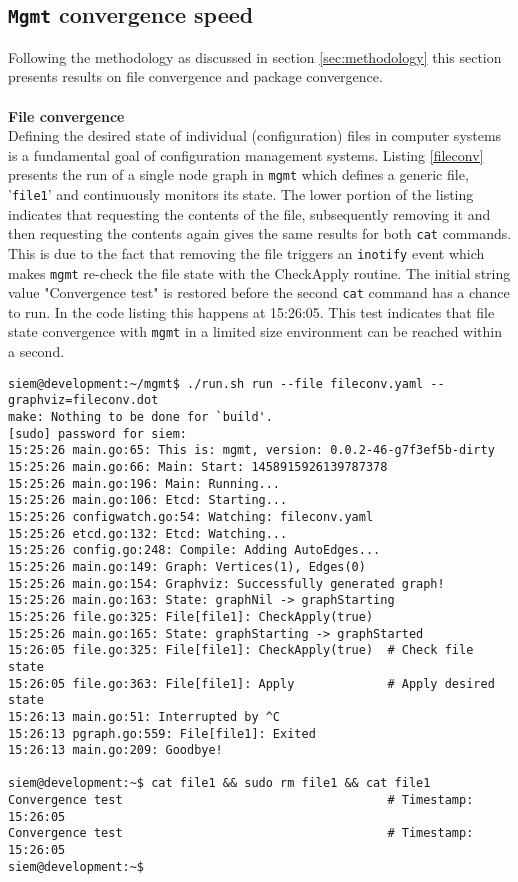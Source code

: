 \subsection{\texttt{Mgmt} convergence speed}
Following the methodology as discussed in section \ref{sec:methodology} this section presents results on file convergence and package convergence. 
\\\\
\noindent
\textbf{File convergence}\\
Defining the desired state of individual (configuration) files in computer systems is a fundamental goal of configuration management systems. Listing \ref{fileconv} presents the run of a single node graph in \texttt{mgmt} which defines a generic file, '\texttt{file1}' and continuously monitors its state. The lower portion of the listing indicates that requesting the contents of the file, subsequently removing it and then requesting the contents again gives the same results for both \texttt{cat} commands. This is due to the fact that removing the file triggers an \texttt{inotify} event which makes \texttt{mgmt} re-check the file state with the CheckApply routine. The initial string value "Convergence test" is restored before the second \texttt{cat} command has a chance to run. In the code listing this happens at 15:26:05. This test indicates that file state convergence with \texttt{mgmt} in a limited size environment can be reached within a second.
\\
\begin{lstlisting}[caption={Rapid file convergence in \texttt{mgmt}},label=fileconv]
siem@development:~/mgmt$ ./run.sh run --file fileconv.yaml --graphviz=fileconv.dot
make: Nothing to be done for `build'.
[sudo] password for siem: 
15:25:26 main.go:65: This is: mgmt, version: 0.0.2-46-g7f3ef5b-dirty
15:25:26 main.go:66: Main: Start: 1458915926139787378
15:25:26 main.go:196: Main: Running...
15:25:26 main.go:106: Etcd: Starting...
15:25:26 configwatch.go:54: Watching: fileconv.yaml
15:25:26 etcd.go:132: Etcd: Watching...
15:25:26 config.go:248: Compile: Adding AutoEdges...
15:25:26 main.go:149: Graph: Vertices(1), Edges(0)
15:25:26 main.go:154: Graphviz: Successfully generated graph!
15:25:26 main.go:163: State: graphNil -> graphStarting
15:25:26 file.go:325: File[file1]: CheckApply(true)
15:25:26 main.go:165: State: graphStarting -> graphStarted
15:26:05 file.go:325: File[file1]: CheckApply(true)  # Check file state
15:26:05 file.go:363: File[file1]: Apply             # Apply desired state 
15:26:13 main.go:51: Interrupted by ^C
15:26:13 pgraph.go:559: File[file1]: Exited
15:26:13 main.go:209: Goodbye!

siem@development:~$ cat file1 && sudo rm file1 && cat file1 
Convergence test                                     # Timestamp: 15:26:05
Convergence test                                     # Timestamp: 15:26:05
siem@development:~$
\end{lstlisting}
